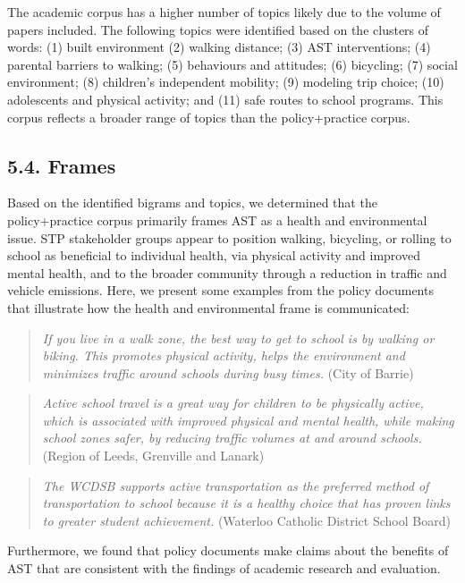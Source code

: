 \documentclass[]{elsarticle} %
\begin{document}
The academic corpus has a higher number of topics likely due to the
volume of papers included. The following topics were identified based on
the clusters of words: (1) built environment (2) walking distance; (3)
AST interventions; (4) parental barriers to walking; (5) behaviours and
attitudes; (6) bicycling; (7) social environment; (8) children's
independent mobility; (9) modeling trip choice; (10) adolescents and
physical activity; and (11) safe routes to school programs. This corpus
reflects a broader range of topics than the policy+practice corpus.

\hypertarget{frames}{%
\subsection{5.4. Frames}\label{frames}}

Based on the identified bigrams and topics, we determined that the
policy+practice corpus primarily frames AST as a health and
environmental issue. STP stakeholder groups appear to position walking,
bicycling, or rolling to school as beneficial to individual health, via
physical activity and improved mental health, and to the broader
community through a reduction in traffic and vehicle emissions. Here, we
present some examples from the policy documents that illustrate how the
health and environmental frame is communicated:

\begin{quote}
\emph{If you live in a walk zone, the best way to get to school is by
walking or biking. This promotes physical activity, helps the
environment and minimizes traffic around schools during busy times.}
(City of Barrie)
\end{quote}

\begin{quote}
\emph{Active school travel is a great way for children to be physically
active, which is associated with improved physical and mental health,
while making school zones safer, by reducing traffic volumes at and
around schools.}(Region of Leeds, Grenville and Lanark)
\end{quote}

\begin{quote}
\emph{The WCDSB supports active transportation as the preferred method
of transportation to school because it is a healthy choice that has
proven links to greater student achievement.} (Waterloo Catholic
District School Board)
\end{quote}

Furthermore, we found that policy documents make claims about the
benefits of AST that are consistent with the findings of academic
research and evaluation.
\end{document}
